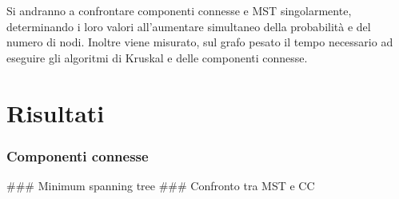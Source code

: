 \documentclass[
]{article}
\begin{document}
Si andranno a confrontare componenti connesse e MST singolarmente,
determinando i loro valori all'aumentare simultaneo della probabilità e
del numero di nodi. Inoltre viene misurato, sul grafo pesato il tempo
necessario ad eseguire gli algoritmi di Kruskal e delle componenti
connesse.

\hypertarget{risultati}{%
\section{Risultati}\label{risultati}}

\hypertarget{componenti-connesse-1}{%
\subsubsection{Componenti connesse}\label{componenti-connesse-1}}

\#\#\# Minimum spanning tree \#\#\# Confronto tra MST e CC
\end{document}
